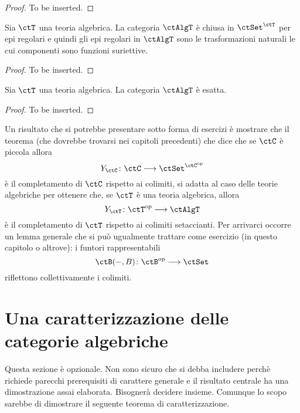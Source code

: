 \begin{proof}
To be inserted.
\end{proof}

\begin{corollary}\label{cor_epi_AlgT}
Sia $\ctT$ una teoria algebrica. La categoria $\ctAlgT$ è chiusa in $\ctSet^{\ctT}$ per epi regolari e quindi gli epi regolari in 
$\ctAlgT$ sono le trasformazioni naturali le cui componenti sono funzioni suriettive.
\end{corollary}

\begin{proof}
To be inserted.
\end{proof}

\begin{corollary}\label{cor_AlgT_esatta}
Sia $\ctT$ una teoria algebrica. La categoria $\ctAlgT$ è esatta.
\end{corollary}

\begin{proof}
To be inserted.
\end{proof}

\begin{warning}\label{caveat_prop_univ_AlgT}
Un risultato che si potrebbe presentare sotto forma di esercizi è mostrare che il teorema (che dovrebbe trovarsi nei
capitoli precedenti) che dice che se $\ctC$ è piccola allora
\[
  Y_{\ctC} \colon \ctC \fun \ctSet^{\ctC^{\mathrm{op}}} 
\]
è il completamento di $\ctC$ rispetto ai colimiti, si adatta al caso delle teorie algebriche per ottenere che, se $\ctT$
è una teoria algebrica, allora
\[
  Y_{\ctT} \colon \ctT^{\mathrm{op}} \fun \ctAlgT 
\]
è il completamento di $\ctT$ rispetto ai colimiti setaccianti. Per arrivarci occorre un lemma generale che si può 
ugualmente trattare come esercizio (in questo capitolo o altrove): i funtori rappresentabili
\[
  \ctB(-,B) \colon \ctB^{\mathrm{op}} \fun \ctSet 
\]
riflettono collettivamente i colimiti.
\end{warning} 

\section{Una caratterizzazione delle categorie algebriche}\label{sec_caract_AlgT}

\begin{warning}\label{caveat_sec_caract_AlgT}
Questa sezione è opzionale. Non sono sicuro che si debba includere perchè richiede parecchi prerequisiti di carattere
generale e il risultato centrale ha una dimostrazione assai elaborata. Bisognerà decidere insieme. Comunque lo scopo
sarebbe di dimostrare il seguente teorema di caratterizzazione.
\end{warning}


